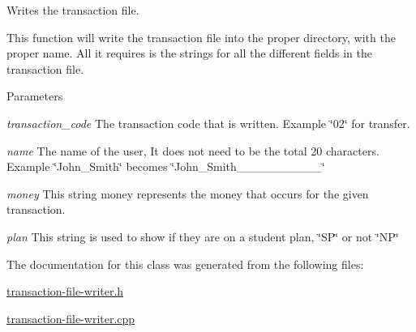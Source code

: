 Writes the transaction file. 

This function will write the transaction file into the proper directory, with the proper name. All it requires is the strings for all the different fields in the transaction file.


\begin{DoxyParams}{Parameters}
\item[{\em transaction\_\-code}]The transaction code that is written. Example \char`\"{}02\char`\"{} for transfer.\item[{\em name}]The name of the user, It does not need to be the total 20 characters. Example \char`\"{}John\_\-Smith\char`\"{} becomes \char`\"{}John\_\-Smith\_\-\_\-\_\-\_\-\_\-\_\-\_\-\_\-\_\-\_\-\char`\"{}\item[{\em money}]This string money represents the money that occurs for the given transaction.\item[{\em plan}]This string is used to show if they are on a student plan, \char`\"{}SP\char`\"{} or not \char`\"{}NP\char`\"{} \end{DoxyParams}


The documentation for this class was generated from the following files:\begin{DoxyCompactItemize}
\item 
\hyperlink{transaction-file-writer_8h}{transaction-\/file-\/writer.h}\item 
\hyperlink{transaction-file-writer_8cpp}{transaction-\/file-\/writer.cpp}\end{DoxyCompactItemize}
